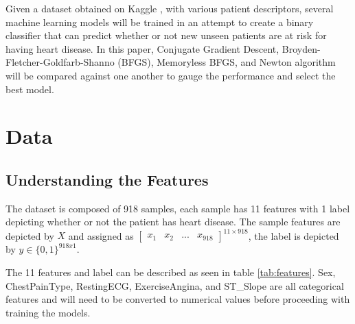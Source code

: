 \documentclass[12pt,conference]{IEEEtran}
\begin{document}
Given a dataset obtained on Kaggle \cite{kaggle}, with various patient descriptors, several machine learning models will be trained in an attempt to create a binary classifier that can predict whether or not new unseen patients are at risk for having heart disease. In this paper, Conjugate Gradient Descent, Broyden-Fletcher-Goldfarb-Shanno (BFGS), Memoryless BFGS, and Newton algorithm will be compared against one another to gauge the performance and select the best model.

\section{Data}
\subsection{Understanding the Features}
The dataset is composed of 918 samples, each sample has 11 features with 1 label depicting whether or not the patient has heart disease. The sample features are depicted by $X$ and assigned as $\begin{bmatrix}x_1& x_2&...&x_{918}\end{bmatrix}^{11\times 918}$, the label is depicted by $y \in \{0,1\}^{918x1}$.

The 11 features and label can be described as seen in table \ref{tab:features}. Sex, ChestPainType, RestingECG, ExerciseAngina, and ST\_Slope are all categorical features and will need to be converted to numerical values before proceeding with training the models. 
 
\end{document}
